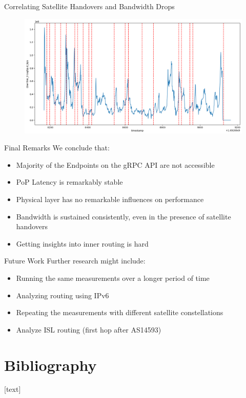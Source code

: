 \documentclass[NET,english,beameralt]{tumbeamer}
\begin{document}
\begin{frame}[fragile]{Correlating Satellite Handovers and Bandwidth Drops}
    \begin{figure}
        \includegraphics[width=0.8\columnwidth]{pics/correlation_handovers_bw.png}
    \end{figure}
\end{frame}

\begin{frame}[fragile]{Final Remarks}
    We conclude that:
    \begin{itemize}
        \item Majority of the Endpoints on the gRPC API are not accessible
        \item PoP Latency is remarkably stable
        \item Physical layer has no remarkable influences on performance
        \item Bandwidth is sustained consistently, even in the presence of satellite handovers
        \item Getting insights into inner routing is hard
    \end{itemize}
\end{frame}

\begin{frame}[fragile]{Future Work}
    Further research might include:
    \begin{itemize}
        \item Running the same measurements over a longer period of time
        \item Analyzing routing using IPv6
        \item Repeating the measurements with different satellite constellations
        \item Analyze ISL routing (first hop after AS14593)
    \end{itemize}
\end{frame}

\section{Bibliography}
\begin{frame}[allowframebreaks]
    
    [text]
    \footnotesize
    
\end{frame}
\end{document}

